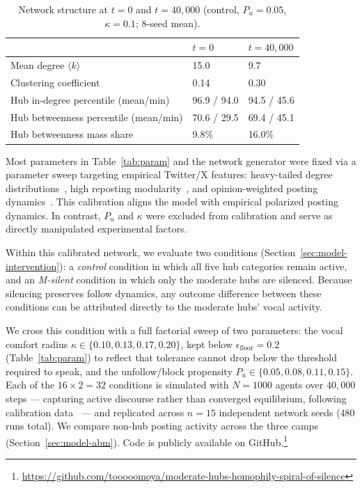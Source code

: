 \documentclass{svproc}
\def\BoundedConfidence{\epsilon} %
\def\VCR{\kappa}                 %
\begin{document}
\begin{table}[t]
\centering
\caption{Network structure at $t=0$ and $t=40{,}000$ (control,
$P_u=0.05$, $\VCR=0.1$; 8-seed mean).}\label{tab:netstats}
\tabcolsep=5pt
\begin{tabular}{lll}
\toprule
 & $t=0$ & $t=40{,}000$ \\
\midrule
Mean degree $\langle k\rangle$ & 15.0 & 9.7 \\
Clustering coefficient & 0.14 & 0.30 \\
Hub in-degree percentile (mean/min) & 96.9 / 94.0 & 94.5 / 45.6 \\
Hub betweenness percentile (mean/min) & 70.6 / 29.5 & 69.4 / 45.1 \\
Hub betweenness mass share & 9.8\% & 16.0\% \\
\bottomrule
\end{tabular}
\end{table}


Most parameters in Table~\ref{tab:param} and the network generator
were fixed via a parameter sweep targeting empirical Twitter/X
features: heavy-tailed degree distributions~\cite{kwak2010}, high
reposting modularity~\cite{conover2011}, and opinion-weighted posting
dynamics~\cite{buntain2025}. This calibration aligns the model with
empirical polarized posting dynamics. In contrast, $P_u$ and $\VCR$
were excluded from calibration and serve as directly manipulated
experimental factors.
\par


Within this calibrated network, we evaluate two conditions
(Section~\ref{sec:model-intervention}): a \emph{control} condition in
which all five hub categories remain active, and an \emph{M-silent}
condition in which only the moderate hubs are silenced. Because
silencing preserves follow dynamics, any outcome difference between
these conditions can be attributed directly to the moderate hubs'
vocal activity.
\par



We cross this condition with a full factorial sweep of two parameters:
the vocal comfort radius $\VCR\in\{0.10,0.13,0.17,0.20\}$, kept below
$\BoundedConfidence_{\mathrm{floor}}=0.2$ (Table~\ref{tab:param}) to
reflect that tolerance cannot drop below the threshold required to
speak, and the unfollow/block propensity
$P_u\in\{0.05,0.08,0.11,0.15\}$. Each of the $16\times2=32$ conditions
is simulated with $N=1000$ agents over $40{,}000$ steps --- capturing
active discourse rather than converged equilibrium, following
calibration data~\cite{buntain2025} --- and replicated across $n=15$
independent network seeds (480 runs total). We compare non-hub posting
activity across the three camps (Section~\ref{sec:model-abm}). Code is
publicly available on
GitHub.\footnote{\url{https://github.com/tooooomoya/moderate-hubs-homophily-spiral-of-silence}}
\end{document}
